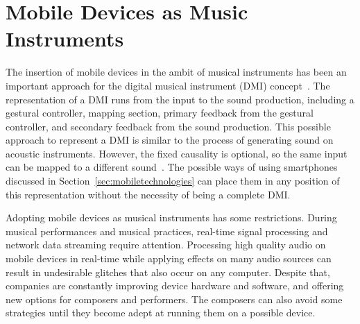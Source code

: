 \section{Mobile Devices as Music Instruments}
\label{sec:mobileinstruments}

The insertion of mobile devices in the ambit of musical instruments has been an important approach for the digital musical instrument (DMI) concept~\citep{Miranda2006newdigitalmusical}.
The representation of a DMI runs from the input to the sound production, including a gestural controller, mapping section, primary feedback from the gestural controller, and secondary feedback from the sound production.
This possible approach to represent a DMI is similar to the process of generating sound on acoustic instruments.
However, the fixed causality is optional, so the same input can be mapped to a different sound~\citep{Miranda2006newdigitalmusical}.
The possible ways of using smartphones discussed in Section~\ref{sec:mobiletechnologies} can place them in any position of this representation without the necessity of being a complete DMI.

Adopting mobile devices as musical instruments has some restrictions.
During musical performances and musical practices, real-time signal processing and network data streaming 
require attention.
Processing high quality audio on mobile devices in real-time while applying effects on many audio sources can result in undesirable glitches that also occur on any computer.
Despite that, companies are constantly improving device hardware and software, and offering new options for composers and performers.
The composers can also avoid some strategies until they become adept at running them on a possible device.

